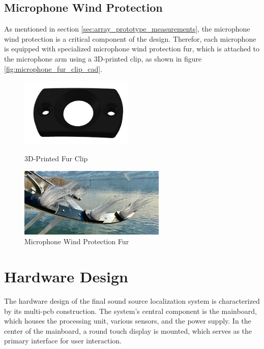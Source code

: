 \subsection{Microphone Wind Protection}
As mentioned in section \ref{sec:array_prototype_measurements}, the microphone wind protection is a critical component of the design.
Therefor, each microphone is equipped with specialized microphone wind protection fur, which is attached to the microphone arm using a 3D-printed clip, as shown in figure \ref{fig:microphone_fur_clip_cad}.
\begin{figure}[h!]
	\centering
	\begin{minipage}{0.44\textwidth}
		\centering
		\includegraphics[height=3.3cm]{images/6_design_final/microphone_furr_clip_cad.png}
		\caption{3D-Printed Fur Clip}
		\label{fig:microphone_fur_clip_cad}
	\end{minipage}
	\begin{minipage}{0.55\textwidth}
		\centering
		\includegraphics[height=3.3cm]{images/6_design_final/microphone_furr_clip.jpg}
		\caption{Microphone Wind Protection Fur}
		\label{fig:microphone_fur_clip}
	\end{minipage}
\end{figure}

\newpage
\section{Hardware Design}
The hardware design of the final sound source localization system is characterized by its multi-\acrshort{pcb} construction.
The system's central component is the mainboard, which houses the processing unit, various sensors, and the power supply.
In the center of the mainboard, a round touch display is mounted, which serves as the primary interface for user interaction.

